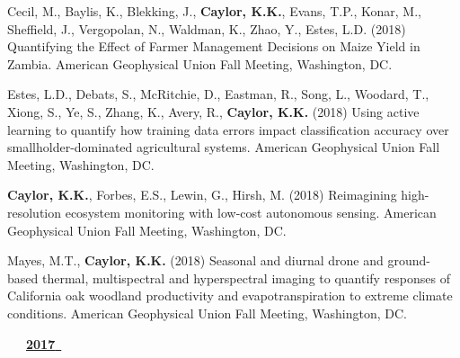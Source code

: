 \begin{etaremune}
\item Cecil, M., Baylis, K., Blekking, J., \textbf{ Caylor, K.K.}, Evans, T.P., Konar, M., Sheffield, J., Vergopolan, N., Waldman, K., Zhao, Y., Estes, L.D. (2018) Quantifying the Effect of Farmer Management Decisions on Maize Yield in Zambia. American Geophysical Union Fall Meeting, Washington, DC.
\item Estes, L.D., Debats, S., McRitchie, D., Eastman, R., Song, L., Woodard, T., Xiong, S., Ye, S., Zhang, K., Avery, R., \textbf{ Caylor, K.K.} (2018) Using active learning to quantify how training data errors impact classification accuracy over smallholder-dominated agricultural systems. American Geophysical Union Fall Meeting, Washington, DC.
\item \textbf{ Caylor, K.K.}, Forbes, E.S., Lewin, G., Hirsh, M. (2018) Reimagining high-resolution ecosystem monitoring with low-cost autonomous sensing. American Geophysical Union Fall Meeting, Washington, DC.
\item Mayes, M.T., \textbf{ Caylor, K.K.} (2018) Seasonal and diurnal drone and ground-based thermal, multispectral and hyperspectral imaging to quantify responses of California oak woodland productivity and evapotranspiration to extreme climate conditions. American Geophysical Union Fall Meeting, Washington, DC.

\vspace{0.1in}
\mbox{\ \ \ \underline{\textbf{2017 }}}
\vspace{0.1in}


\end{etaremune}

